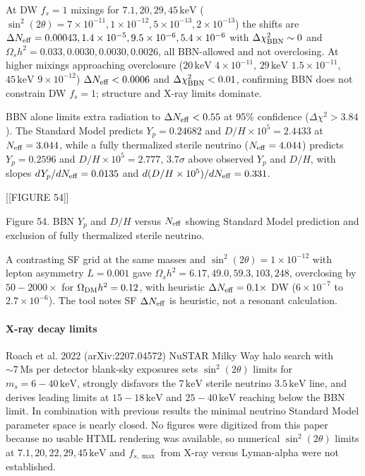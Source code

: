 \documentclass[11pt,a4paper]{article}
\begin{document}
At DW $f_s=1$ mixings for $7.1, 20, 29, 45\,\mathrm{keV}$ ($\sin^2(2\theta) = 7\times10^{-11}, 1\times10^{-12}, 5\times10^{-13}, 2\times10^{-13}$) the shifts are $\Delta N_{\rm eff} = 0.00043, 1.4\times10^{-5}, 9.5\times10^{-6}, 5.4\times10^{-6}$ with $\Delta\chi^2_{\rm BBN} \sim 0$ and $\Omega_s h^2 = 0.033, 0.0030, 0.0030, 0.0026$, all BBN-allowed and not overclosing. At higher mixings approaching overclosure ($20\,\mathrm{keV}$ $4\times10^{-11}$, $29\,\mathrm{keV}$ $1.5\times10^{-11}$, $45\,\mathrm{keV}$ $9\times10^{-12}$) $\Delta N_{\rm eff} < 0.0006$ and $\Delta\chi^2_{\rm BBN} < 0.01$, confirming BBN does not constrain DW $f_s=1$; structure and X-ray limits dominate.

BBN alone limits extra radiation to $\Delta N_{\rm eff} < 0.55$ at 95\% confidence ($\Delta\chi^2 > 3.84$). The Standard Model predicts $Y_p = 0.24682$ and $D/H\times10^5 = 2.4433$ at $N_{\rm eff} = 3.044$, while a fully thermalized sterile neutrino ($N_{\rm eff} = 4.044$) predicts $Y_p = 0.2596$ and $D/H\times10^5 = 2.777$, $3.7\sigma$ above observed $Y_p$ and $D/H$, with slopes $dY_p/dN_{\rm eff} = 0.0135$ and $d(D/H\times10^5)/dN_{\rm eff} = 0.331$.


[[FIGURE 54]]

Figure 54. BBN $Y_p$ and $D/H$ versus $N_{\rm eff}$ showing Standard Model prediction and exclusion of fully thermalized sterile neutrino.

A contrasting SF grid at the same masses and $\sin^2(2\theta) = 1\times10^{-12}$ with lepton asymmetry $L = 0.001$ gave $\Omega_s h^2 = 6.17, 49.0, 59.3, 103, 248$, overclosing by $50-2000\times$ for $\Omega_{\rm DM}h^2 = 0.12$, with heuristic $\Delta N_{\rm eff} = 0.1\times$ DW ($6\times10^{-7}$ to $2.7\times10^{-6}$). The tool notes SF $\Delta N_{\rm eff}$ is heuristic, not a resonant calculation.

\paragraph{X-ray decay limits}
Roach et al. 2022 (arXiv:2207.04572) NuSTAR Milky Way halo search with $\sim 7\,\mathrm{Ms}$ per detector blank-sky exposures sets $\sin^2(2\theta)$ limits for $m_s = 6-40\,\mathrm{keV}$, strongly disfavors the $7\,\mathrm{keV}$ sterile neutrino $3.5\,\mathrm{keV}$ line, and derives leading limits at $15-18\,\mathrm{keV}$ and $25-40\,\mathrm{keV}$ reaching below the BBN limit. In combination with previous results the minimal neutrino Standard Model parameter space is nearly closed. No figures were digitized from this paper because no usable HTML rendering was available, so numerical $\sin^2(2\theta)$ limits at $7.1, 20, 22, 29, 45\,\mathrm{keV}$ and $f_{s,\max}$ from X-ray versus Lyman-alpha were not established.
\end{document}
